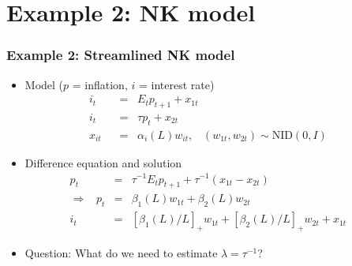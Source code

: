 \documentclass{beamer}
\begin{document}
\section{Example 2:  NK model}
\begin{frame}
\frametitle{Example 2: Streamlined NK model}
\begin{itemize} \itemsep=\bigskipamount
\item Model ($p$ = inflation, $i$ = interest rate) 
\begin{align*}
    i_t &\;\;=\;\;  E_t p_{t+1} + x_{1t} \tag{Euler equation} \\
    i_t &\;\;=\;\;  \tau p_{t} +  x_{2t} \tag{Taylor rule} \\
    x_{it} &\;\;=\;\; \alpha_i(L) w_{it}, \;\;\; (w_{1t},w_{2t}) \sim \mbox{NID}(0,I)
            \phantom{xx}
\end{align*}
\item Difference equation and solution
\begin{eqnarray*}
    p_t &=&  \tau^{-1} E_t p_{t+1} + \tau^{-1} (x_{1t} - x_{2t})
        \phantom{\sum} \\
    \Rightarrow \;\;\;
    p_t &=& \beta_1(L) w_{1t} + \beta_2(L) w_{2t} \\
    i_t &=&  [\beta_1(L)/L]_+ w_{1t} + [\beta_2(L)/L]_+ w_{2t} + x_{1t}
             \phantom{xx}
\end{eqnarray*}
\item Question:  What do we need to estimate $\lambda = \tau^{-1}$?
\end{itemize}
\end{frame}
\end{document}
